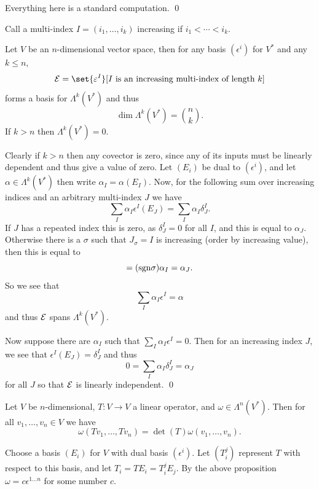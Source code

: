 \eprop

\bproof

    Everything here is a standard computation.
    \qed

\eproof

Call a multi-index $I=(i_1,\dots,i_k)$ {\emphcolor increasing} if $i_1<\cdots<i_k$.

\bprop

    Let $V$ be an $n$-dimensional vector space, then for any basis $(\epsilon^i)$ for $V^*$ and any $k\leq n$,
    $$ \c E = \set{\epsilon^I}[\hbox{$I$ is an increasing multi-index of length $k$}] $$
    forms a basis for $\Lambda^k(V^*)$ and thus
    $$ \dim\Lambda^k(V^*) = \binom nk . $$
    If $k>n$ then $\Lambda^k(V^*)=0$.

\eprop

\bproof

    Clearly if $k>n$ then any covector is zero, since any of its inputs must be linearly dependent and thus give a value of zero.
    Let $(E_i)$ be dual to $(\epsilon^i)$, and let $\alpha\in\Lambda^k(V^*)$ then write $\alpha_I=\alpha(E_I)$.
    Now, for the following sum over increasing indices and an arbitrary multi-index $J$ we have
    $$ \sum_I\alpha_I\epsilon^I(E_J) = \sum_I\alpha_I\delta^I_J . $$
    If $J$ has a repeated index this is zero, as $\delta^I_J=0$ for all $I$, and this is equal to $\alpha_J$.
    Otherwise there is a $\sigma$ such that $J_\sigma=I$ is increasing (order by increasing value), then this is equal to
    $$ = ({\rm sgn}\sigma)\alpha_I = \alpha_J . $$
    So we see that
    $$ \sum_I\alpha_I\epsilon^I = \alpha $$
    and thus ${\cal E}$ spans $\Lambda^k(V^*)$.

    Now suppose there are $\alpha_I$ such that $\sum_I\alpha_I\epsilon^I=0$.
    Then for an increasing index $J$, we see that $\epsilon^I(E_J)=\delta^I_J$ and thus
    $$ 0 = \sum_I\alpha_I\delta^I_J = \alpha_J $$
    for all $J$ so that ${\cal E}$ is linearly independent.
    \qed

\eproof

\bprop

    Let $V$ be $n$-dimensional, $T\colon V\to V$ a linear operator, and $\omega\in\Lambda^n(V^*)$.
    Then for all $v_1,\dots,v_n\in V$ we have
    $$ \omega(Tv_1,\dots,Tv_n) = \det(T)\omega(v_1,\dots,v_n) . $$

\eprop

\bproof

    Choose a basis $(E_i)$ for $V$ with dual basis $(\epsilon^i)$.
    Let $(T^j_i)$ represent $T$ with respect to this basis, and let $T_i=TE_i=T^j_iE_j$.
    By the above proposition $\omega=c\epsilon^{1\dots n}$ for some number $c$.

